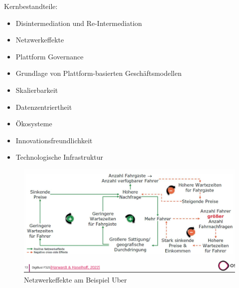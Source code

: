 \documentclass[../Main.tex]{subfiles}
\begin{document}
Kernbestandteile:
\begin{itemize}
    \item Disintermediation und Re-Intermediation
    \item Netzwerkeffekte
    \item Plattform Governance
    \item Grundlage von Plattform-basierten Geschäftsmodellen
    \item Skalierbarkeit
    \item Datenzentriertheit
    \item Ökosysteme
    \item Innovationsfreundlichkeit
    \item Technologische Infrastruktur
\end{itemize}


\begin{figure}[H]
    \centering
    \includegraphics[width=1\linewidth]{Images/digbus/netzwerkeffekteuber.png}
    \caption{Netzwerkeffekte am Beispiel Uber}
\end{figure}
\end{document}
